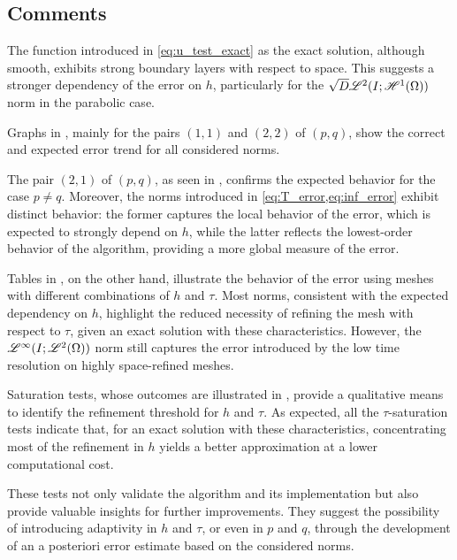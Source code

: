 \newpage
\subsection{Comments} \label{sec:test_discussion}

The function introduced in \cref{eq:u_test_exact} as the exact solution, although smooth, exhibits strong boundary layers with respect to space. This suggests a stronger dependency of the error on $h$, particularly for the $\sqrt{D} \mathscr{L}^{2}(I; \mathscr{H}^{1}(\Omega))$ norm in the parabolic case.

Graphs in , mainly for the pairs $\left( 1, 1 \right)$ and $\left( 2, 2 \right)$ of $\left( p, q \right)$, show the correct and expected error trend for all considered norms.

The pair $\left( 2, 1 \right)$ of $\left( p, q \right)$, as seen in , confirms the expected behavior for the case $p \neq q$. Moreover, the norms introduced in \cref{eq:T_error,eq:inf_error} exhibit distinct behavior: the former captures the local behavior of the error, which is expected to strongly depend on $h$, while the latter reflects the lowest-order behavior of the algorithm, providing a more global measure of the error.

Tables in , on the other hand, illustrate the behavior of the error using meshes with different combinations of $h$ and $\tau$. Most norms, consistent with the expected dependency on $h$, highlight the reduced necessity of refining the mesh with respect to $\tau$, given an exact solution with these characteristics. However, the $\mathscr{L}^{\infty}(I; \mathscr{L}^{2}(\Omega))$ norm still captures the error introduced by the low time resolution on highly space-refined meshes.

Saturation tests, whose outcomes are illustrated in , provide a qualitative means to identify the refinement threshold for $h$ and $\tau$. As expected, all the $\tau$-saturation tests indicate that, for an exact solution with these characteristics, concentrating most of the refinement in $h$ yields a better approximation at a lower computational cost.

These tests not only validate the algorithm and its implementation but also provide valuable insights for further improvements. They suggest the possibility of introducing adaptivity in $h$ and $\tau$, or even in $p$ and $q$, through the development of an a posteriori error estimate based on the considered norms.